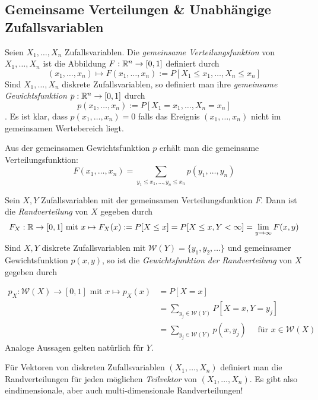 \subsection{Gemeinsame Verteilungen \& Unabhängige Zufallsvariablen}
\begin{definition}
Seien $X_1,\dots, X_n$ Zufallsvariablen. Die \textit{gemeinsame Verteilungsfunktion} von $X_1,\dots,X_n$ ist die Abbildung $F:\mathbb{R}^n \to [0,1]$ definiert durch 
$$ (x_1,\dots,x_n) \mapsto F(x_1,\dots,x_n) := P[X_1 \leq x_1, \dots, X_n \leq x_n]$$
Sind $X_1, \dots, X_n$ diskrete Zufallsvariablen, so definiert man ihre \textit{gemeinsame Gewichtsfunktion} $p:\mathbb{R}^n \to [0,1]$ durch 
$$ p(x_1,\dots,x_n):= P[X_1 = x_1, \dots, X_n = x_n]$$.
Es ist klar, dass $p(x_1,\dots,x_n) = 0$ falls das Ereignis $(x_1, \dots, x_n)$ nicht im gemeinsamen Wertebereich liegt.
\end{definition}
Aus der gemeinsamen Gewichtsfunktion $p$ erhält man die gemeinsame Verteilungsfunktion:
$$ F(x_1, \dots, x_n) = \sum_{y_1 \leq x_1, \dots, y_n \leq x_n} p(y_1,\dots,y_n)$$

\begin{definition}
Sein $X,Y$ Zufallsvariablen mit der gemeinsamen Verteilungsfunktion $F$. Dann ist die \textit{Randverteilung} von $X$ gegeben durch
$$F_X:\mathbb{R} \to [0,1] \mbox{  mit  } x\mapsto F_X(x) := P[X \leq x] = P[X \leq x, Y < \infty] = \lim_{y\to \infty} F(x,y)$$
Sind $X,Y$ diskrete Zufallsvariablen mit $\mathcal{W}(Y) = \{y_1,y_2,\dots \}$ und gemeinsamer Gewichtsfunktion $p(x,y)$, so ist die \textit{Gewichtsfunktion der Randverteilung} von $X$ gegeben durch

\begin{align*}
	p_X: \mathcal{W}(X) \to [0,1] \mbox{  mit  } x \mapsto p_X(x) &= P[X=x] \\&= \sum_{y_j \in \mathcal{W}(Y)} P[X=x, Y = y_j] \\&= \sum_{y_j \in \mathcal{W}(Y)} p(x,y_j) \quad \mbox{ für } x\in \mathcal{W}(X)
\end{align*}
Analoge Aussagen gelten natürlich für $Y$.
\end{definition} 

Für Vektoren von diskreten Zufallsvariablen $(X_1, \dots, X_n)$ definiert man die Randverteilungen für jeden möglichen \textit{Teilvektor} von $(X_1,\dots, X_n)$. Es gibt also eindimensionale, aber auch multi-dimensionale Randverteilungen!\\

